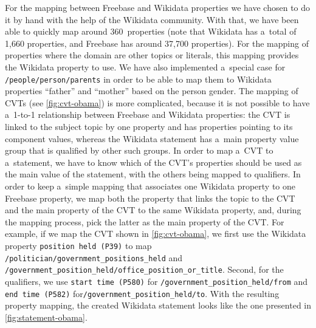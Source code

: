 \documentclass{acm_proc_article-sp}
\begin{document}
For the mapping between Freebase and Wikidata properties we have chosen to do it by hand
with the help of the Wikidata community.
With that, we have been able to quickly map around 360~properties
(note that Wikidata has a~total of 1,660 properties, and Freebase has around 37,700 properties).
For the mapping of properties where the domain are other topics or literals,
this mapping provides the Wikidata property to use.
We have also implemented a~special case for \texttt{/people/person/parents}
in order to be able to map them to Wikidata properties ``father'' and ``mother''
based on the person gender.
The mapping of CVTs (see \autoref{fig:cvt-obama}) is more complicated,
because it is not possible to have a~\mbox{1-to-1} relationship
between Freebase and Wikidata properties: the CVT is linked to the subject topic by one property
and has properties pointing to its component values, whereas the Wikidata statement
has a~main property value group that is qualified by other such groups.
In order to map a~CVT to a~statement, we have to know which of the CVT's properties
should be used as the main value of the statement, with the others being mapped to qualifiers.
In order to keep a~simple mapping that associates one Wikidata property to one Freebase property,
we map both the property that links the topic to the CVT
and the main property of the CVT to the same Wikidata property, and, during the mapping process,
pick the latter as the main property of the CVT.
For example, if we map the CVT shown in \autoref{fig:cvt-obama},
we first use the Wikidata property \texttt{position held (P39)} to map
\texttt{/politician/government\_positions\_held} and
\texttt{/government\_position\_held/office\_position\_or\_title}.
Second, for the qualifiers, we use \texttt{start time (P580)}
for \texttt{/government\_position\_held/from} and \texttt{end time (P582)}
for\linebreak \texttt{/government\_position\_held/to}.
With the resulting property mapping, the created Wikidata statement
looks like the one presented in \autoref{fig:statement-obama}.
\end{document}
